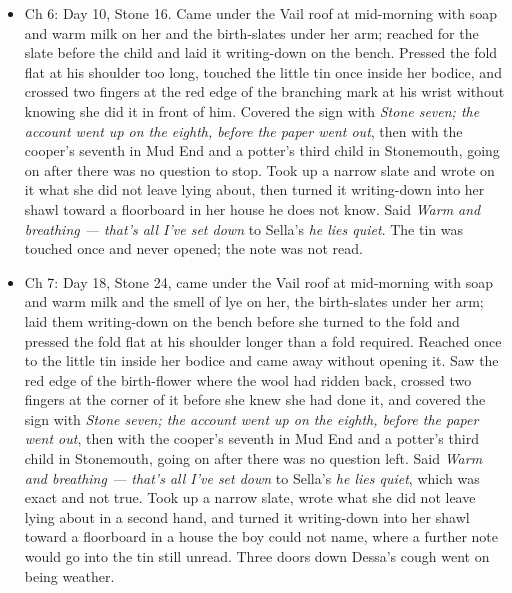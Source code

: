 \documentclass{design/chronicle}
\begin{document}
{\begin{itemize}[leftmargin=1.4em,itemsep=1pt,topsep=3pt,parsep=0pt]
\item Ch 6: Day 10, Stone 16. Came under the Vail roof at mid-morning with soap and warm milk on her and the birth-slates under her arm; reached for the slate before the child and laid it writing-down on the bench. Pressed the fold flat at his shoulder too long, touched the little tin once inside her bodice, and crossed two fingers at the red edge of the branching mark at his wrist without knowing she did it in front of him. Covered the sign with \emph{Stone seven; the account went up on the eighth, before the paper went out}, then with the cooper’s seventh in Mud End and a potter’s third child in Stonemouth, going on after there was no question to stop. Took up a narrow slate and wrote on it what she did not leave lying about, then turned it writing-down into her shawl toward a floorboard in her house he does not know. Said \emph{Warm and breathing --- that’s all I’ve set down} to Sella’s \emph{he lies quiet}. The tin was touched once and never opened; the note was not read.

\end{itemize}

\begin{itemize}[leftmargin=1.4em,itemsep=1pt,topsep=3pt,parsep=0pt]

\item Ch 7: Day 18, Stone 24, came under the Vail roof at mid-morning with soap and warm milk and the smell of lye on her, the birth-slates under her arm; laid them writing-down on the bench before she turned to the fold and pressed the fold flat at his shoulder longer than a fold required. Reached once to the little tin inside her bodice and came away without opening it. Saw the red edge of the birth-flower where the wool had ridden back, crossed two fingers at the corner of it before she knew she had done it, and covered the sign with \emph{Stone seven; the account went up on the eighth, before the paper went out}, then with the cooper’s seventh in Mud End and a potter’s third child in Stonemouth, going on after there was no question left. Said \emph{Warm and breathing --- that’s all I’ve set down} to Sella’s \emph{he lies quiet}, which was exact and not true. Took up a narrow slate, wrote what she did not leave lying about in a second hand, and turned it writing-down into her shawl toward a floorboard in a house the boy could not name, where a further note would go into the tin still unread. Three doors down Dessa’s cough went on being weather.

\end{itemize}

}
\end{document}
